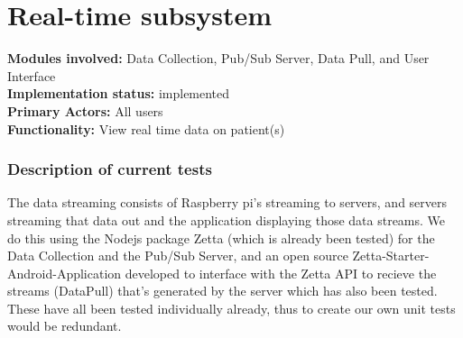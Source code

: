 \documentclass[12pt]{article}
\begin{document}
{	\pagebreak

	\section{Real-time subsystem}
	\textbf{Modules involved:} Data Collection,  Pub/Sub Server, Data Pull, and User Interface \\
	\textbf{Implementation status:} implemented \\
	\textbf{Primary Actors:} All users \\
	\textbf{Functionality:} View real time data on patient(s)\\
	\subsubsection{Description of current tests}
	The data streaming consists of Raspberry pi's streaming to servers, and servers streaming that data out and the application displaying those data streams. We do this using the Nodejs package Zetta (which is already been tested) for the Data Collection and the Pub/Sub Server, and an open source Zetta-Starter-Android-Application developed to interface with the Zetta API to recieve the streams (DataPull) that's generated by the server which has also been tested. These have all been tested individually already, thus to create our own unit tests would be redundant. \\ \\ 

}
\end{document}
